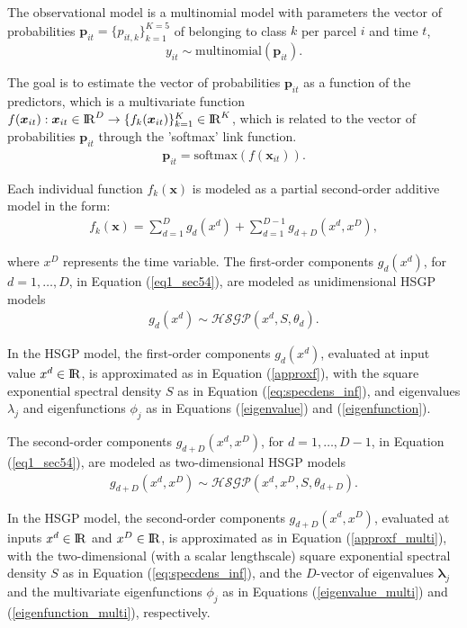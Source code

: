 \documentclass[]{interact}
\theoremstyle{plain}%
\theoremstyle{definition}
\theoremstyle{remark}
\begin{document}
The observational model is a multinomial model with parameters the vector of probabilities $\bm{p}_{it}=\{p_{it,k}\}_{k=1}^{K=5}$ of belonging to class $k$ per parcel $i$ and time $t$,
%
\begin{equation*}
y_{it} \sim \text{multinomial}(\bm{p}_{it}).
\end{equation*}

\noindent The goal is to estimate the vector of probabilities $\bm{p}_{it}$ as a function of the predictors, which is a multivariate function $f(\bm{x}_{it}):\bm{x}_{it}\in {\rm I\!R}^{D} \rightarrow \{f_k(\bm{x}_{it})\}_{k=1}^K \in {\rm I\!R}^{K}$, which is related to the vector of probabilities $\bm{p}_{it}$ through the 'softmax' link function.
%
\begin{eqnarray*}
\bm{p}_{it} = \text{softmax}(f(\bm{x}_{it})).
\end{eqnarray*}

Each individual function $f_k(\bm{x})$ is modeled as a partial second-order additive model in the form: 
%
\begin{eqnarray} \label{eq1_sec54}
f_k(\bm{x}) = \sum_{d=1}^{D} g_d(x^d) + \sum_{d=1}^{D-1} g_{d+D}(x^d,x^D),
\end{eqnarray}

\noindent where $x^D$ represents the time variable. The first-order components $g_d(x^d)$, for $d=1,\dots,D$, in Equation (\ref{eq1_sec54}), are modeled as unidimensional HSGP models
%
\begin{eqnarray*}
g_d(x^d) \sim \mathcal{HSGP}(x^d, S, \theta_d).
\end{eqnarray*}

\noindent In the HSGP model, the first-order components $g_d(x^d)$, evaluated at input value $x^d \in {\rm I\!R}$, is approximated as in Equation (\ref{approxf}), with the square exponential spectral density $S$ as in Equation (\ref{eq:specdens_inf}), and eigenvalues $\lambda_j$  and eigenfunctions $\phi_j$ as in Equations (\ref{eigenvalue}) and (\ref{eigenfunction}). 

The second-order components $g_{d+D}(x^d,x^D)$, for $d=1,\dots,D-1$, in Equation (\ref{eq1_sec54}), are modeled as two-dimensional HSGP models
%
\begin{eqnarray*}
g_{d+D}(x^d,x^D) \sim \mathcal{HSGP}(x^d,x^D, S, \theta_{d+D}).
\end{eqnarray*} 

\noindent In the HSGP model, the second-order components $g_{d+D}(x^d,x^D)$, evaluated at inputs $x^d \in {\rm I\!R}$ and $x^D \in {\rm I\!R}$, is approximated as in Equation (\ref{approxf_multi}), with the two-dimensional (with a scalar lengthscale) square exponential spectral density $S$ as in Equation (\ref{eq:specdens_inf}), and the $D$-vector of eigenvalues $\bm{\lambda}_j$ and the multivariate eigenfunctions $\phi_j$ as in Equations (\ref{eigenvalue_multi}) and (\ref{eigenfunction_multi}), respectively. 
\end{document}
